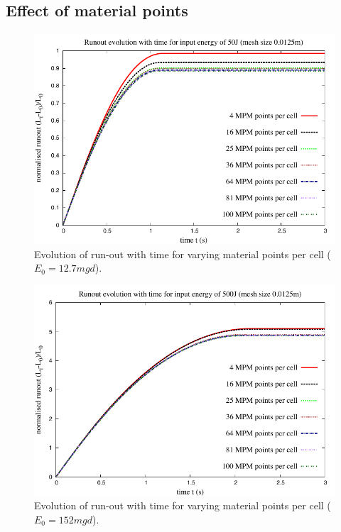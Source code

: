 \subsection{Effect of material points}

\begin{figure}[tbhp]
\centering
\includegraphics[width=\textwidth]{Runout_50}
\caption{Evolution of run-out with time for varying material points per cell ($E_0=12.7mgd$).}
\label{fig:Runout_50}
\end{figure}

\begin{figure}[tbhp]
\centering
\includegraphics[width=\textwidth]{Runout_500}
\caption{Evolution of run-out with time for varying material points per cell ($E_0=152mgd$).}
\label{fig:Runout_500}
\end{figure}

